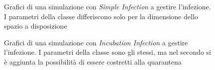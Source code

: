 \documentclass[a4paper,10pt,twocolumn]{article}
\begin{document}
\begin{figure}[p]
    \centering
    \caption{Grafici di una simulazione con \emph{Simple Infection} a gestire l'infezione. I parametri della classe differiscono solo per la dimensione dello spazio a disposizione}
\end{figure}

\begin{figure}[p]
    \centering
    \caption{Grafici di una simulazione con \emph{Incubation Infection} a gestire l'infezione. I parametri della classe sono gli stessi, ma nel secondo si è aggiunta la possibilità di essere costretti alla quarantena}
    \label{fig:incubation}
\end{figure}
\end{document}
